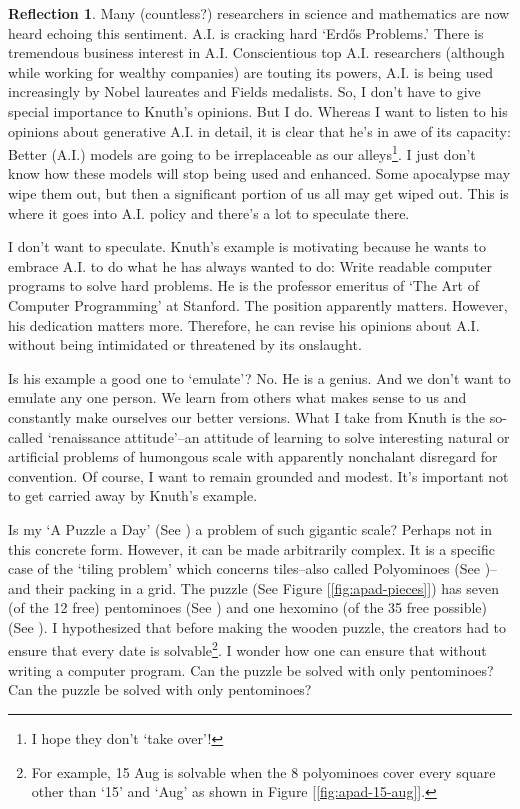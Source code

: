 \documentclass[11pt]{book}
\theoremstyle{definition}
\theoremstyle{plain}
\theoremstyle{problemstyle}
\theoremstyle{remark}
\theoremstyle{definition}
\newtheorem{reflection}{Reflection}
\begin{document}
\begin{reflection}
    Many (countless?) researchers in science and mathematics are now heard echoing this sentiment. A.I. is cracking hard `Erd\H{o}s Problems.' There is tremendous business interest in A.I. Conscientious top A.I. researchers (although while working for wealthy companies) are touting its powers, A.I. is being used increasingly by Nobel laureates and Fields medalists. So, I don't have to give special importance to Knuth's opinions. But I do. Whereas I want to listen to his opinions about generative A.I. in detail, it is clear that he's in awe of its capacity: Better (A.I.) models are going to be irreplaceable as our alleys\footnote{I hope they don't `take over'!}. I just don't know how these models will stop being used and enhanced. Some apocalypse may wipe them out, but then a significant portion of us all may get wiped out. This is where it goes into A.I. policy and there's a lot to speculate there. 

    I don't want to speculate. Knuth's example is motivating because he wants to embrace A.I. to do what he has always wanted to do: Write readable computer programs to solve hard problems. He is the professor emeritus of `The Art of Computer Programming' at Stanford. The position apparently matters. However, his dedication matters more. Therefore, he can revise his opinions about A.I. without being intimidated or threatened by its onslaught.

    Is his example a good one to `emulate'? No. He is a genius. And we don't want to emulate any one person. We learn from others what makes sense to us and constantly make ourselves our better versions. What I take from Knuth is the so-called `renaissance attitude'--an attitude of learning to solve interesting natural or artificial problems of humongous scale with apparently nonchalant disregard for convention. Of course, I want to remain grounded and modest. It's important not to get carried away by Knuth's example.

    Is my `A Puzzle a Day' (See \cite{apad}) a problem of such gigantic scale? Perhaps not in this concrete form. However, it can be made arbitrarily complex. It is a specific case of the `tiling problem' which concerns tiles--also called Polyominoes (See \cite{polyominoes})--and their packing in a grid. The puzzle (See Figure [\ref{fig:apad-pieces}]) has seven (of the 12 free) pentominoes (See \cite{free-pentominoes}) and one hexomino (of the 35 free possible) (See \cite{free-hexominoes}). I hypothesized that before making the wooden puzzle, the creators had to ensure that every date is solvable\footnote{For example, 15 Aug is solvable when the 8 polyominoes cover every square other than `15' and `Aug' as shown in Figure [\ref{fig:apad-15-aug}].}. I wonder how one can ensure that without writing a computer program. Can the puzzle be solved with only pentominoes? Can the puzzle be solved with only pentominoes?


\end{reflection}
\end{document}
